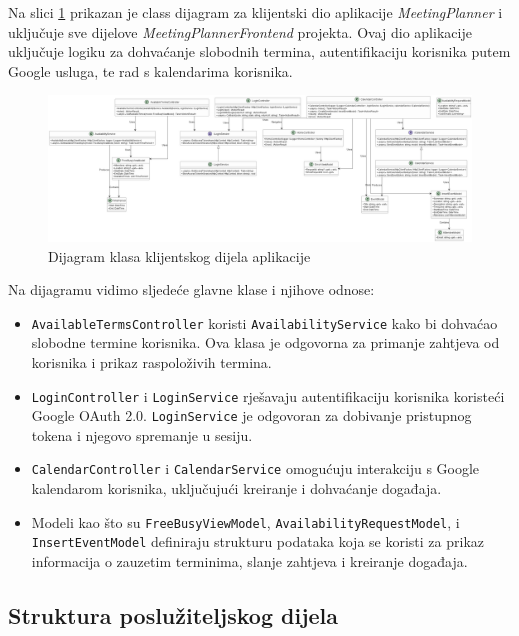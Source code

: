 \documentclass{foi}
\begin{document}
Na slici \ref{fig:frontend-uml} prikazan je class dijagram za klijentski dio aplikacije \textit{MeetingPlanner} i uključuje sve dijelove \textit{MeetingPlannerFrontend} projekta. Ovaj dio aplikacije uključuje logiku za dohvaćanje slobodnih termina, autentifikaciju korisnika putem Google usluga, te rad s kalendarima korisnika.

\begin{figure}[H]
    \centering
    \includegraphics[width=1\textwidth]{slike/MeetingPlannerFrontend_ClassUML.png}
    \caption{Dijagram klasa klijentskog dijela aplikacije}
    \label{fig:frontend-uml}
\end{figure}

Na dijagramu vidimo sljedeće glavne klase i njihove odnose:
\begin{itemize}
    \item \texttt{AvailableTermsController} koristi \texttt{AvailabilityService} kako bi dohvaćao slobodne termine korisnika. Ova klasa je odgovorna za primanje zahtjeva od korisnika i prikaz raspoloživih termina.
    \item \texttt{LoginController} i \texttt{LoginService} rješavaju autentifikaciju korisnika koristeći Google OAuth 2.0. \texttt{LoginService} je odgovoran za dobivanje pristupnog tokena i njegovo spremanje u sesiju.
    \item \texttt{CalendarController} i \texttt{CalendarService} omogućuju interakciju s Google kalendarom korisnika, uključujući kreiranje i dohvaćanje događaja.
    \item Modeli kao što su \texttt{FreeBusyViewModel}, \texttt{AvailabilityRequestModel}, i \texttt{InsertEventModel} definiraju strukturu podataka koja se koristi za prikaz informacija o zauzetim terminima, slanje zahtjeva i kreiranje događaja.
\end{itemize}

\subsection{Struktura poslužiteljskog dijela}
\end{document}
